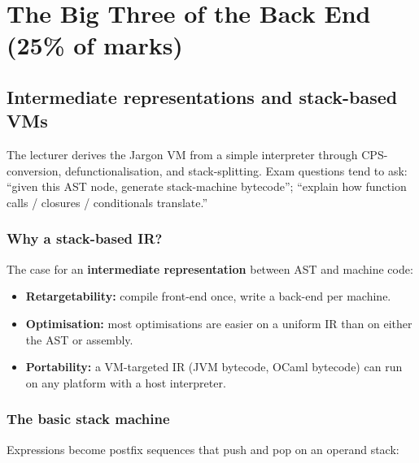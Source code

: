 \documentclass[11pt,a4paper]{article}
\begin{document}
\hrulefill

\section{The Big Three of the Back End (25\% of marks)}

\subsection{Intermediate representations and stack-based VMs}

\begin{useful}
The lecturer derives the Jargon VM from a simple interpreter through CPS-conversion, defunctionalisation, and stack-splitting. Exam questions tend to ask: ``given this AST node, generate stack-machine bytecode''; ``explain how function calls / closures / conditionals translate.''
\end{useful}

\subsubsection*{Why a stack-based IR?}

The case for an \textbf{intermediate representation} between AST and machine code:
\begin{itemize}[leftmargin=*,itemsep=0pt]
  \item \textbf{Retargetability:} compile front-end once, write a back-end per machine.
  \item \textbf{Optimisation:} most optimisations are easier on a uniform IR than on either the AST or assembly.
  \item \textbf{Portability:} a VM-targeted IR (JVM bytecode, OCaml bytecode) can run on any platform with a host interpreter.
\end{itemize}

\subsubsection*{The basic stack machine}

Expressions become postfix sequences that push and pop on an operand stack:
\end{document}

